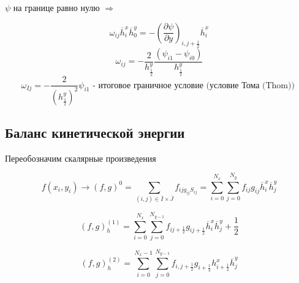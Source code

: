 \documentclass[12pt, a4paper]{article}
\begin{document}
$ \psi $ на границе равно нулю $ \Rightarrow $

\[ \omega_{ij} \overline{h}^x_i \overline{h}^y_0 = -(\frac{\partial \psi}{\partial y})_{i,j+\frac{1}{2}} \overline{h}^x_i \]
\[ \omega_{ij} = -\frac{2}{h^y_{\frac{1}{2}}} \frac{(\psi_{i1} - \psi_{i0})}{h^y_{\frac{1}{2}}} \]
\[ \omega_{Ij} = -\frac{2}{{(h^y_\frac{1}{2})}^2} \psi_{i1} \textrm{ - итоговое граничное условие (условие Тома (Thom)) } \]

\subsection{Баланс кинетической энергии}

Переобозначим скалярные произведения

\[ f(x_i, y_i) \rightarrow {(f,g)}^0 = \sum_{(i,j) \in \overline{I} \times \overline{J}}^{} f_{ij g_{ij}S_{ij}} = \sum_{i=0}^{N_x}\sum_{j=0}^{N_y} f_{ij} g_{ij} \overline{h}^x_i \overline{h}^y_j \]

\[ (f,g)_h^{(1)} = \sum_{i=0}^{N_x} \sum_{j=0}^{N_{y-1}} f_{ij+\frac{1}{2}} g_{ij+\frac{1}{2}} \overline{h}^x_i \overline{h}^y_j+\frac{1}{2} \]

\[ {(f,g)}^{(2)}_h = \sum_{i=0}^{N_x-1} \sum_{j=0}^{N_{y-1}} f_{i, j+\frac{1}{2}} g_{i+\frac{1}{2}} h^x_{i+\frac{1}{2}} \overline{h}^y_j \]
\end{document}
